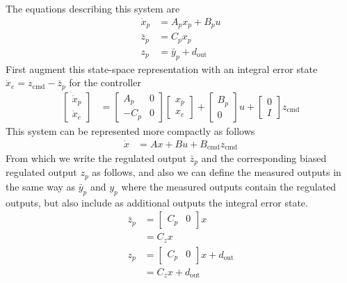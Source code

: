The equations describing this system are
\begin{align*}
  \dot{x}_{p}&=A_{p}x_{p}+B_{p}u \\
  \bar{z}_{p}&=C_{p}x_{p} \\
  z_{p}&=\bar{y}_{p}+d_{\text{out}}
\end{align*}
First augment this state-space representation with an integral error state $\dot{x}_{e}=z_{\text{cmd}}-\bar{z}_{p}$ for the controller
\begin{align*}
  \begin{bmatrix}
    \dot{x}_{p} \\
    \dot{x}_{e}
  \end{bmatrix}&=
  \begin{bmatrix}
    A_{p} & 0 \\
    -C_{p} & 0
  \end{bmatrix}
  \begin{bmatrix}
    x_{p} \\
    x_{e}
  \end{bmatrix}+
  \begin{bmatrix}
    B_{p} \\
    0
  \end{bmatrix}u+
  \begin{bmatrix}
    0 \\
    I
  \end{bmatrix}z_{\text{cmd}}
\end{align*}
This system can be represented more compactly as follows
\begin{align*}
  \dot{x}&=Ax+Bu+B_{\text{cmd}}z_{\text{cmd}}
\end{align*}
From which we write the regulated output $\bar{z}_{p}$ and the corresponding biased regulated output $z_{p}$ as follows, and also we can define the measured outputs in the same way as $\bar{y}_{p}$ and $y_{p}$ where the measured outputs contain the regulated outputs, but also include as additional outputs the integral error state.
\begin{align*}
  \bar{z}_{p}&=
  \begin{bmatrix}
    C_{p} & 0
  \end{bmatrix}x \\
  &=C_{z}x \\
  z_{p}&=
  \begin{bmatrix}
    C_{p} & 0
  \end{bmatrix}x+d_{\text{out}} \\
  &=C_{z}x+d_{\text{out}}
\end{align*}
